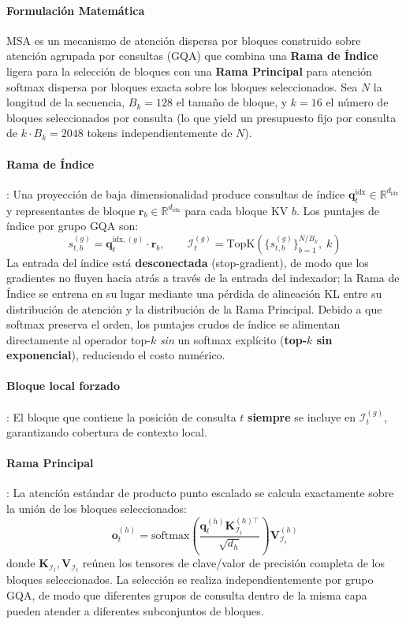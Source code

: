 \paragraph{Formulación Matemática}

MSA \citep{lai_minimax_2026} es un mecanismo de atención dispersa por bloques construido sobre atención agrupada por consultas (GQA) que combina una \textbf{Rama de Índice} ligera para la selección de bloques con una \textbf{Rama Principal} para atención softmax dispersa por bloques exacta sobre los bloques seleccionados. Sea $N$ la longitud de la secuencia, $B_k = 128$ el tamaño de bloque, y $k = 16$ el número de bloques seleccionados por consulta (lo que yield un presupuesto fijo por consulta de $k \cdot B_k = 2048$ tokens independientemente de $N$).

\paragraph{Rama de Índice}: Una proyección de baja dimensionalidad produce consultas de índice $\mathbf{q}_t^{\text{idx}} \in \mathbb{R}^{d_{\text{idx}}}$ y representantes de bloque $\mathbf{r}_b \in \mathbb{R}^{d_{\text{idx}}}$ para cada bloque KV $b$. Los puntajes de índice por grupo GQA son:
\[
s_{t,b}^{(g)} = \mathbf{q}_t^{\text{idx},(g)} \cdot \mathbf{r}_b, \qquad \mathcal{I}_t^{(g)} = \mathrm{TopK}\left(\{s_{t,b}^{(g)}\}_{b=1}^{N/B_k},\; k\right)
\]
La entrada del índice está \textbf{desconectada} (stop-gradient), de modo que los gradientes no fluyen hacia atrás a través de la entrada del indexador; la Rama de Índice se entrena en su lugar mediante una pérdida de alineación KL entre su distribución de atención y la distribución de la Rama Principal. Debido a que softmax preserva el orden, los puntajes crudos de índice se alimentan directamente al operador top-$k$ \emph{sin} un softmax explícito (\textbf{top-$k$ sin exponencial}), reduciendo el costo numérico.

\paragraph{Bloque local forzado}: El bloque que contiene la posición de consulta $t$ \textbf{siempre} se incluye en $\mathcal{I}_t^{(g)}$, garantizando cobertura de contexto local.

\paragraph{Rama Principal}: La atención estándar de producto punto escalado se calcula exactamente sobre la unión de los bloques seleccionados:
\[
\mathbf{o}_t^{(h)} = \mathrm{softmax}\left(\frac{\mathbf{q}_t^{(h)} \mathbf{K}_{\mathcal{I}_t}^{(h)\top}}{\sqrt{d_h}}\right) \mathbf{V}_{\mathcal{I}_t}^{(h)}
\]
donde $\mathbf{K}_{\mathcal{I}_t}, \mathbf{V}_{\mathcal{I}_t}$ reúnen los tensores de clave/valor de precisión completa de los bloques seleccionados. La selección se realiza independientemente por grupo GQA, de modo que diferentes grupos de consulta dentro de la misma capa pueden atender a diferentes subconjuntos de bloques.

